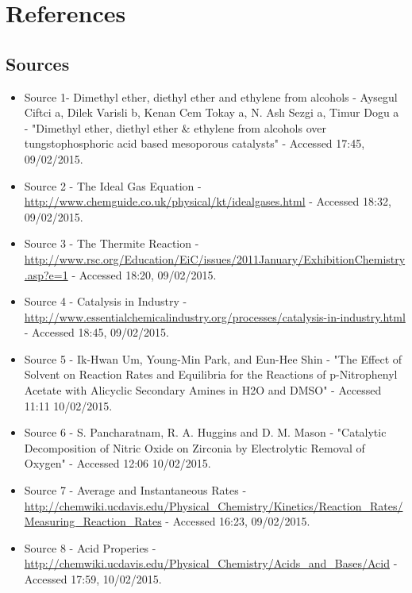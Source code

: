 \chapter{References}

\section{Sources}

\begin{itemize}
\item Source 1- Dimethyl ether, diethyl ether and ethylene from alcohols - Aysegul Ciftci a, Dilek Varisli b, Kenan Cem Tokay a, N. Aslı Sezgi a, Timur Dogu a - "Dimethyl ether, diethyl ether \& ethylene from alcohols over tungstophosphoric acid based mesoporous catalysts" - Accessed 17:45, 09/02/2015.

\item Source 2 - The Ideal Gas Equation - \url{http://www.chemguide.co.uk/physical/kt/idealgases.html} - Accessed 18:32, 09/02/2015.

\item Source 3 - The Thermite Reaction - \url{http://www.rsc.org/Education/EiC/issues/2011January/ExhibitionChemistry.asp?e=1} - Accessed 18:20, 09/02/2015.

\item Source 4 - Catalysis in Industry - \url{http://www.essentialchemicalindustry.org/processes/catalysis-in-industry.html} - Accessed 18:45, 09/02/2015.

\item Source 5 - Ik-Hwan Um, Young-Min Park, and Eun-Hee Shin - "The Effect of Solvent on Reaction Rates and Equilibria for the Reactions of
p-Nitrophenyl Acetate with Alicyclic Secondary Amines in H2O and DMSO" - Accessed 11:11 10/02/2015.

\item Source 6 - S. Pancharatnam, R. A. Huggins and D. M. Mason - "Catalytic Decomposition of Nitric Oxide on Zirconia by Electrolytic Removal of Oxygen" - Accessed 12:06 10/02/2015.

\item Source 7  - Average and Instantaneous Rates - \url{http://chemwiki.ucdavis.edu/Physical_Chemistry/Kinetics/Reaction_Rates/Measuring_Reaction_Rates} - Accessed 16:23, 09/02/2015.

\item Source 8 - Acid Properies - \url{http://chemwiki.ucdavis.edu/Physical_Chemistry/Acids_and_Bases/Acid} - Accessed 17:59, 10/02/2015.


\end{itemize}
